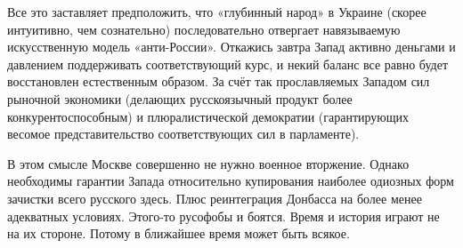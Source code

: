 Все это заставляет предположить, что «глубинный народ» в Украине (скорее
интуитивно, чем сознательно) последовательно отвергает навязываемую
искусственную модель «анти-России». Откажись завтра Запад активно деньгами и
давлением поддерживать соответствующий курс, и некий баланс все равно будет
восстановлен естественным образом. За счёт так прославляемых Западом сил
рыночной экономики (делающих русскоязычный продукт более конкурентоспособным) и
плюралистической демократии (гарантирующих весомое представительство
соответствующих сил в парламенте). 

В этом смысле Москве совершенно не нужно военное вторжение. Однако необходимы
гарантии Запада относительно купирования наиболее одиозных форм зачистки всего
русского здесь. Плюс реинтеграция Донбасса на более менее адекватных условиях.
Этого-то русофобы и боятся. Время и история играют не на их стороне. Потому в
ближайшее время может быть всякое.
